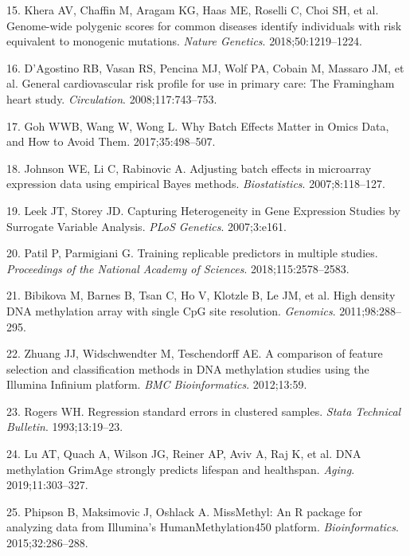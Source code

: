 \documentclass[]{article}
\begin{document}
\leavevmode\hypertarget{ref-Khera2018}{}%
15. Khera AV, Chaffin M, Aragam KG, Haas ME, Roselli C, Choi SH, et al.
Genome-wide polygenic scores for common diseases identify individuals
with risk equivalent to monogenic mutations. \emph{Nature Genetics}.
2018;50:1219--1224.

\leavevmode\hypertarget{ref-DAgostino2008}{}%
16. D'Agostino RB, Vasan RS, Pencina MJ, Wolf PA, Cobain M, Massaro JM,
et al. General cardiovascular risk profile for use in primary care: The
Framingham heart study. \emph{Circulation}. 2008;117:743--753.

\leavevmode\hypertarget{ref-Goh2017}{}%
17. Goh WWB, Wang W, Wong L. Why Batch Effects Matter in Omics Data, and
How to Avoid Them. 2017;35:498--507.

\leavevmode\hypertarget{ref-Johnson2007}{}%
18. Johnson WE, Li C, Rabinovic A. Adjusting batch effects in microarray
expression data using empirical Bayes methods. \emph{Biostatistics}.
2007;8:118--127.

\leavevmode\hypertarget{ref-Leek2007}{}%
19. Leek JT, Storey JD. Capturing Heterogeneity in Gene Expression
Studies by Surrogate Variable Analysis. \emph{PLoS Genetics}.
2007;3:e161.

\leavevmode\hypertarget{ref-Patil2018}{}%
20. Patil P, Parmigiani G. Training replicable predictors in multiple
studies. \emph{Proceedings of the National Academy of Sciences}.
2018;115:2578--2583.

\leavevmode\hypertarget{ref-Bibikova2011}{}%
21. Bibikova M, Barnes B, Tsan C, Ho V, Klotzle B, Le JM, et al. High
density DNA methylation array with single CpG site resolution.
\emph{Genomics}. 2011;98:288--295.

\leavevmode\hypertarget{ref-Zhuang2012}{}%
22. Zhuang JJ, Widschwendter M, Teschendorff AE. A comparison of feature
selection and classification methods in DNA methylation studies using
the Illumina Infinium platform. \emph{BMC Bioinformatics}. 2012;13:59.

\leavevmode\hypertarget{ref-Rogers1993}{}%
23. Rogers WH. Regression standard errors in clustered samples.
\emph{Stata Technical Bulletin}. 1993;13:19--23.

\leavevmode\hypertarget{ref-Lu2019}{}%
24. Lu AT, Quach A, Wilson JG, Reiner AP, Aviv A, Raj K, et al. DNA
methylation GrimAge strongly predicts lifespan and healthspan.
\emph{Aging}. 2019;11:303--327.

\leavevmode\hypertarget{ref-Phipson2015}{}%
25. Phipson B, Maksimovic J, Oshlack A. MissMethyl: An R package for
analyzing data from Illumina's HumanMethylation450 platform.
\emph{Bioinformatics}. 2015;32:286--288.
\end{document}
